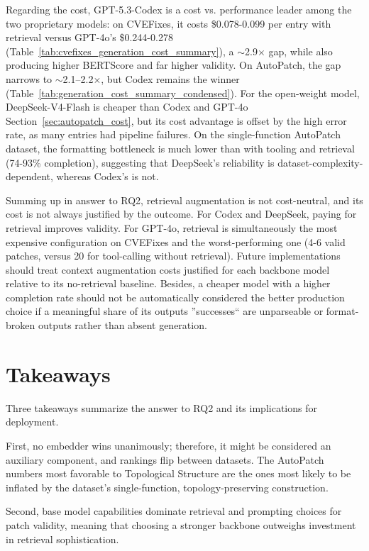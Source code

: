 Regarding the cost, GPT-5.3-Codex is a cost vs. performance leader among the two proprietary models: on CVEFixes, it costs \$0.078-0.099 per entry with retrieval versus GPT-4o's \$0.244-0.278 (Table~\ref{tab:cvefixes_generation_cost_summary}), a $\sim$2.9$\times$ gap, while also producing higher BERTScore and far higher validity.
On AutoPatch, the gap narrows to $\sim$2.1--2.2$\times$, but Codex remains the winner (Table~\ref{tab:generation_cost_summary_condensed}).
For the open-weight model, DeepSeek-V4-Flash is cheaper than Codex and GPT-4o Section~\ref{sec:autopatch_cost}, but its cost advantage is offset by the high error rate, as many entries had pipeline failures.
On the single-function AutoPatch dataset, the formatting bottleneck is much lower than with tooling and retrieval (74-93\% completion), suggesting that DeepSeek's reliability is dataset-complexity-dependent, whereas Codex's is not.

Summing up in answer to RQ2, retrieval augmentation is not cost-neutral, and its cost is not always justified by the outcome. 
For Codex and DeepSeek, paying for retrieval improves validity. 
For GPT-4o, retrieval is simultaneously the most expensive configuration on CVEFixes and the worst-performing one (4-6 valid patches, versus 20 for tool-calling without retrieval).
Future implementations should treat context augmentation costs justified for each backbone model relative to its no-retrieval baseline. %
Besides, a cheaper model with a higher completion rate should not be automatically considered the better production choice if a meaningful share of its outputs ''successes`` are unparseable or format-broken outputs rather than absent generation.

\section{Takeaways}\label{sec:conclusion_takeaways}

Three takeaways summarize the answer to RQ2 and its implications for deployment.

First, no embedder wins unanimously; therefore, it might be considered an auxiliary component, and rankings flip between datasets.
The AutoPatch numbers most favorable to Topological Structure are the ones most likely to be inflated by the dataset's single-function, topology-preserving construction.

Second, base model capabilities dominate retrieval and prompting choices for patch validity, meaning that choosing a stronger backbone outweighs investment in retrieval sophistication. 

